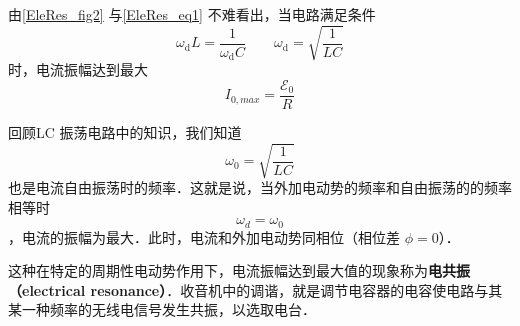 由\autoref{EleRes_fig2} 与\autoref{EleRes_eq1} 不难看出，当电路满足条件
\begin{equation}
\omega_{\mathrm{d}} L=\dfrac{1}{\omega_{\mathrm{d}} C}
\qquad 
\omega_{\mathrm{d}}=\sqrt{\frac{1}{L C}}
\end{equation}
时，电流振幅达到最大
$$I_{0,max}=\dfrac{\mathscr{E}_{0}}{R}$$

回顾LC 振荡电路中的知识，我们知道$$\omega_0 = \sqrt{\frac{1}{LC}}$$也是电流自由振荡时的频率．这就是说，当外加电动势的频率和自由振荡的的频率相等时$$\omega_d=\omega_0$$，电流的振幅为最大．此时，电流和外加电动势同相位（相位差 $\phi=0$）．

这种在特定的周期性电动势作用下，电流振幅达到最大值的现象称为\textbf{电共振（electrical resonance）}．收音机中的调谐，就是调节电容器的电容使电路与其某一种频率的无线电信号发生共振，以选取电台．
